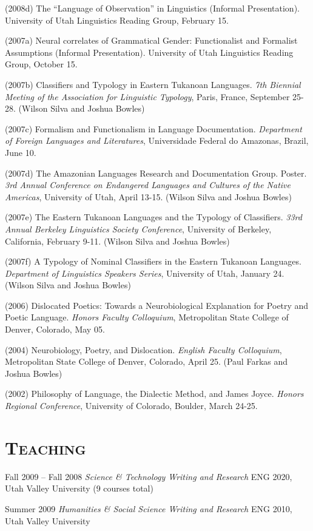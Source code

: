 \documentclass{resume}
\begin{document}
\begin{resume}
(2008d) The ``Language of Observation'' in Linguistics (Informal Presentation). University of Utah Linguistics Reading Group, February 15.

(2007a) Neural correlates of Grammatical Gender: Functionalist and Formalist
Assumptions (Informal Presentation). University of Utah Linguistics Reading
Group, October 15.

(2007b) Classifiers and Typology in Eastern Tukanoan Languages. \emph{7th Biennial Meeting of the Association for Linguistic Typology}, Paris, France, September 25-28.
(Wilson Silva and Joshua Bowles)

(2007c) Formalism and Functionalism in Language Documentation. \emph{Department of
Foreign Languages and Literatures}, Universidade Federal do Amazonas, Brazil,
June 10.

(2007d) The Amazonian Languages Research and Documentation Group. Poster. \emph{3rd
Annual Conference on Endangered Languages and Cultures of the Native
Americas}, University of Utah, April 13-15.
(Wilson Silva and Joshua Bowles)

(2007e) The Eastern Tukanoan Languages and the Typology of Classifiers. \emph{33rd Annual Berkeley Linguistics Society Conference}, University of Berkeley, California,
February 9-11. (Wilson Silva and Joshua Bowles)

(2007f) A Typology of Nominal Classifiers in the Eastern Tukanoan Languages.
\emph{Department of Linguistics Speakers Series}, University of Utah, January 24. (Wilson Silva and Joshua Bowles)

(2006) Dislocated Poetics: Towards a Neurobiological Explanation for Poetry and Poetic
Language. \emph{Honors Faculty Colloquium}, Metropolitan State College of Denver,
Colorado, May 05.

(2004) Neurobiology, Poetry, and Dislocation. \emph{English Faculty Colloquium}, Metropolitan State College of Denver, Colorado, April 25. (Paul Farkas and Joshua Bowles)

(2002) Philosophy of Language, the Dialectic Method, and James Joyce. \emph{Honors Regional Conference}, University of Colorado, Boulder, March 24-25.


\section{\textsc{Teaching}}
Fall 2009 -- Fall 2008 \emph{Science \& Technology Writing and Research} ENG 2020, Utah Valley University (9 courses total)

Summer 2009  \emph{Humanities \& Social Science Writing and Research} ENG 2010, Utah Valley University


\end{resume}
\end{document}
